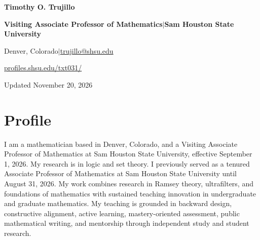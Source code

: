 \documentclass[10pt,letterpaper]{article}
\begin{document}
\fontsize{10.7}{13.3}\selectfont
\RaggedRight
\thispagestyle{empty}
{\sffamily\bfseries\fontsize{29}{33}\selectfont Timothy O. Trujillo}\par
{\sffamily\bfseries\fontsize{13}{17}\selectfont Visiting Associate Professor of Mathematics\enspace $\vert$\enspace Sam Houston State University}\par
Denver, Colorado\enspace $\vert$\enspace\href{mailto:trujillo@shsu.edu}{trujillo@shsu.edu}\par
\href{https://profiles.shsu.edu/txt031/}{profiles.shsu.edu/txt031/}\par
{\small Updated November 20, 2026}\par

\section*{Profile}
I am a mathematician based in Denver, Colorado, and a Visiting Associate Professor of Mathematics at Sam Houston State University, effective September 1, 2026. My research is in logic and set theory. I previously served as a tenured Associate Professor of Mathematics at Sam Houston State University until August 31, 2026. My work combines research in Ramsey theory, ultrafilters, and foundations of mathematics with sustained teaching innovation in undergraduate and graduate mathematics. My teaching is grounded in backward design, constructive alignment, active learning, mastery-oriented assessment, public mathematical writing, and mentorship through independent study and student research.\par
\end{document}
